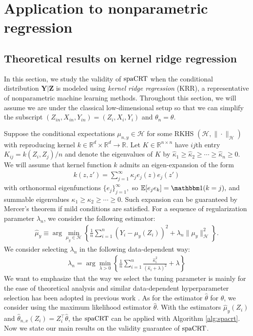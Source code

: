 \documentclass[12pt]{article}
\theoremstyle{definition}
\newcommand{\E}{\mathbb E}								%
\newcommand{\indicator}{\mathbbm 1}						%
\newcommand{\srx}{X}									%
\newcommand{\prz}{\bm Z}								%
\newcommand{\srz}{Z}									%
\newcommand{\pry}{{\bm Y}}								%
\newcommand{\sry}{Y}									%
\newcommand{\spacrt}{\textnormal{spaCRT}}               %
\begin{document}
\clearpage


\section{Application to nonparametric regression}

\subsection{Theoretical results on kernel ridge regression}\label{sec:theory_nonparametric_RF_classification}

In this section, we study the validity of $\spacrt$ when the conditional distribution $\pry|\prz$ is modeled using \textit{kernel ridge regression} (KRR), a representative of nonparametric machine learning methods. Throughout this section, we will assume we are under the classical low-dimensional setup so that we can simplify the subscript $(\srz_{in},\srx_{in},\sry_{in})=(\srz_{i},\srx_{i},\sry_{i})$ and $\theta_n=\theta$. 

Suppose the conditional expectations $\mu_{n,y}\in\mathcal{H}$ for some RKHS $(\mathcal{H},\|\cdot\|_{\mathcal{H}})$ with reproducing kernel $k\in\mathbb{R}^{d}\times \mathbb{R}^d\rightarrow\mathbb{R}$. Let $K\in\mathbb{R}^{n\times n}$ have $ij$th entry $K_{ij}=k(\srz_{i},\srz_{j})/n$ and denote the eigenvalues of $K$ by $\widehat{\kappa}_{1}\geq\widehat{\kappa}_2\geq\cdots\geq\widehat{\kappa}_n\geq 0$. We will assume that kernel function $k$ admits an eigen-expansion of the form 
\begin{align}\label{eq:eigven_expansion}
  k(z,z')=\sum_{j=1}^{\infty}\kappa_{j}e_j(z)e_j(z')
\end{align}
with orthonormal eigenfunctions $\{e_{j}\}_{j=1}^{\infty},$ so $\E[e_je_k]=\indicator(k=j),$ and summable eigenvalues $\kappa_1\geq\kappa_2\geq\cdots\geq0$. Such expansion can be guaranteed by Mercer's theorem if mild conditions are satisfied. For a sequence of regularization parameter $\lambda_n$, we consider the following estimator:
\begin{align}\label{eq:KRR_mu_y}
  \widehat{\mu}_{y}\equiv\arg\min_{\mu_{y}\in\mathcal{H}} \left\{\frac{1}{n}\sum_{i=1}^n (\sry_{i}-\mu_{y}(\srz_{i}))^2+\lambda_n\|\mu_{y}\|_{\mathcal{H}}^2\right\}.
\end{align}
We consider selecting $\lambda_n$ in the following data-dependent way:
\begin{align}\label{eq:lambda_n}
  \lambda_n=\arg\min_{\lambda>0}\left\{\frac{1}{n}\sum_{i=1}^n\frac{\widehat{\kappa}_i^2}{(\widehat{\kappa}_i+\lambda)^2}+\lambda\right\}
\end{align}
We want to emphasize that the way we select the tuning parameter is mainly for the ease of theoretical analysis and similar data-dependent hyperparameter selection has been adopted in previous work \citet{Niu2022a,Shah2018}. As for the estimator $\widehat{\theta}$ for $\theta$, we consider using the maximum likelihood estimator $\widehat{\theta}$. With the estimators $\widehat{\mu}_{y}(\srz_{i})$ and $\widehat{\theta}_{n,x}(\srz_{i})=\srz_{i}^\top\widehat{\theta}$, the $\spacrt$ can be applied with Algorithm \ref{alg:spacrt}. Now we state our main results on the validity guarantee of $\spacrt$.
\end{document}
